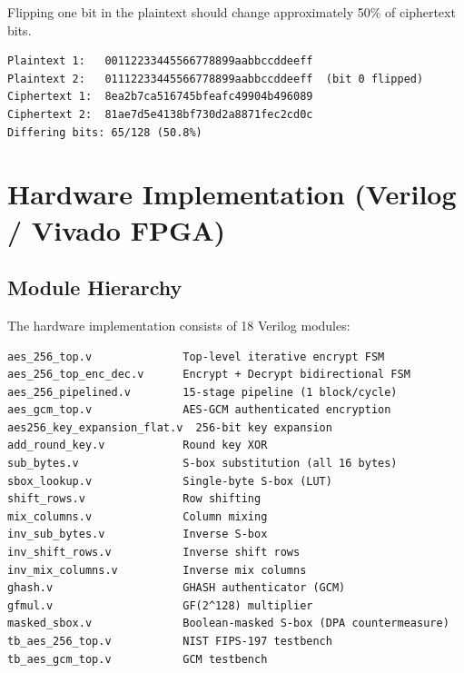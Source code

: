 \documentclass[11pt,a4paper]{article}
\begin{document}
Flipping one bit in the plaintext should change approximately 50\% of ciphertext bits.

\begin{lstlisting}[style=terminal]
Plaintext 1:   00112233445566778899aabbccddeeff
Plaintext 2:   01112233445566778899aabbccddeeff  (bit 0 flipped)
Ciphertext 1:  8ea2b7ca516745bfeafc49904b496089
Ciphertext 2:  81ae7d5e4138bf730d2a8871fec2cd0c
Differing bits: 65/128 (50.8%)
\end{lstlisting}

\begin{center}
\end{center}

\section{Hardware Implementation (Verilog / Vivado FPGA)}

\subsection{Module Hierarchy}

The hardware implementation consists of 18 Verilog modules:

\begin{lstlisting}[style=terminal]
aes_256_top.v              Top-level iterative encrypt FSM
aes_256_top_enc_dec.v      Encrypt + Decrypt bidirectional FSM
aes_256_pipelined.v        15-stage pipeline (1 block/cycle)
aes_gcm_top.v              AES-GCM authenticated encryption
aes256_key_expansion_flat.v  256-bit key expansion
add_round_key.v            Round key XOR
sub_bytes.v                S-box substitution (all 16 bytes)
sbox_lookup.v              Single-byte S-box (LUT)
shift_rows.v               Row shifting
mix_columns.v              Column mixing
inv_sub_bytes.v            Inverse S-box
inv_shift_rows.v           Inverse shift rows
inv_mix_columns.v          Inverse mix columns
ghash.v                    GHASH authenticator (GCM)
gfmul.v                    GF(2^128) multiplier
masked_sbox.v              Boolean-masked S-box (DPA countermeasure)
tb_aes_256_top.v           NIST FIPS-197 testbench
tb_aes_gcm_top.v           GCM testbench
\end{lstlisting}
\end{document}
